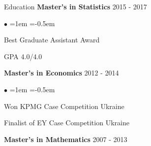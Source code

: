 \documentclass{resume}
\begin{document}
\begin{rSection}{Education}
            {\textbf{Master's in Statistics}} \hfill {2015 - 2017}
        \\ %
        {}
                    \begin{list}{\tiny$\bullet$}{ %
                \leftmargin=1em
                \itemsep=-0.5em
                \vspace{-0.5em}
            }
                            \item Best Graduate Assistant Award
                            \item GPA 4.0/4.0
                        \end{list}
                \vspace{0.1em}
            {\textbf{Master's in Economics}} \hfill {2012 - 2014}
        \\ %
        {}
                    \begin{list}{\tiny$\bullet$}{ %
                \leftmargin=1em
                \itemsep=-0.5em
                \vspace{-0.5em}
            }
                            \item Won KPMG Case Competition Ukraine
                            \item Finalist of EY Case Competition Ukraine
                        \end{list}
                \vspace{0.1em}
            {\textbf{Master's in Mathematics}} \hfill {2007 - 2013}
        \\ %
        {}
                \vspace{0.1em}
    \end{rSection}
\end{document}
